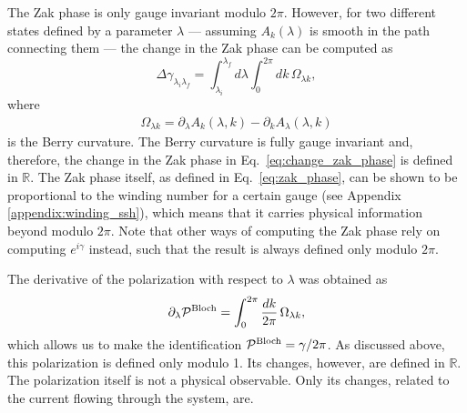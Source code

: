 \documentclass[twocolumn,amsmath,longbibliography,amssymb,superscriptaddress]{revtex4-1}
\begin{document}
The Zak phase is only gauge invariant modulo $2\pi$. However, for two different states defined by a parameter $\lambda$ --- assuming $A_k(\lambda)$ is smooth in the path connecting them --- the change in the Zak phase can be computed as
\begin{equation}
\Delta {\gamma_{\lambda_i \lambda_f}} = \int_{\lambda_i}^{\lambda_f} d\lambda\int_{0}^{2\pi} dk \, \Omega_{\lambda k},
\label{eq:change_zak_phase}
\end{equation}
where 
\begin{align}\label{eq:BerryCurvature}
\Omega_{\lambda k} = \partial_\lambda A_k(\lambda,k) - \partial_k A_\lambda(\lambda,k)
\end{align}
 is the Berry curvature. The Berry curvature is fully gauge invariant and, therefore, the change in the Zak phase in Eq.~\eqref{eq:change_zak_phase} is defined in $\mathbb{R}$. %
The Zak phase itself, as defined in Eq.~\eqref{eq:zak_phase}, can be shown to be proportional to the winding number for a certain gauge (see Appendix \ref{appendix:winding_ssh}), which means that it carries physical information beyond modulo $2\pi$. Note that other ways of computing the Zak phase rely on computing $e^{i\gamma}$ instead, such that the result is always defined only modulo $2\pi$.

The derivative of the polarization with respect to $\lambda$ was obtained \cite{KingSmith1993} as
\begin{equation}\label{eq:Bloch_polarization}
\partial_\lambda \mathcal{P}^{\rm Bloch} = \int_{0}^{2\pi} \frac{dk}{2\pi} \, \Omega_{\lambda k},
\end{equation}
which allows us to make the identification $ \mathcal{P}^{\rm Bloch} = \gamma/2\pi$. 
As discussed above,  this polarization is defined only modulo 1.
Its changes, however, are defined in $\mathbb{R}$. The polarization itself is not a physical observable. Only its changes, related to the current flowing through the system, are.
\end{document}
